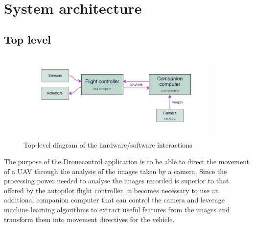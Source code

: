 \section{System architecture}
\label{sec:sysarch}

\subsection{Top level}

\begin{figure}
  \centering
  \includegraphics[width=0.9\textwidth,keepaspectratio]{img/sys-arch-diagram.jpg}
  \caption{Top-level diagram of the hardware/software interactions}
  \label{fig:toplevel}
\end{figure}

The purpose of the Dronecontrol application is to be able to direct the movement of a UAV through the analysis of the images taken by a camera.
Since the processing power needed to analyse the images recorded is superior to that offered by the autopilot flight controller, it becomes necessary to use an additional companion computer that can control the camera and leverage machine learning algorithms to extract useful features from the images and transform them into movement directives for the vehicle.

